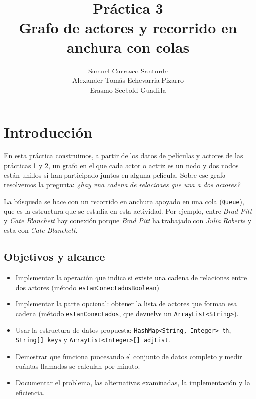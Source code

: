\documentclass[a4paper,11pt]{report}
\title{Práctica 3\\Grafo de actores y recorrido en anchura con colas}
\author{Samuel Carrasco Santurde\\Alexander Tomás Echevarria Pizarro\\Erasmo Seebold Guadilla}
\date{}
\begin{document}
\maketitle
\tableofcontents
\listoftables

\setlength{\parskip}{0.9em plus 0.2em minus 0.1em}

\chapter{Introducción}

En esta práctica construimos, a partir de los datos de películas y actores de las prácticas 1 y 2, un grafo en el que cada actor o actriz es un nodo y dos nodos están unidos si han participado juntos en alguna película. Sobre ese grafo resolvemos la pregunta: \emph{¿hay una cadena de relaciones que una a dos actores?}

La búsqueda se hace con un recorrido en anchura apoyado en una cola (\texttt{Queue}), que es la estructura que se estudia en esta actividad. Por ejemplo, entre \textit{Brad Pitt} y \textit{Cate Blanchett} hay conexión porque \textit{Brad Pitt} ha trabajado con \textit{Julia Roberts} y esta con \textit{Cate Blanchett}.

\section{Objetivos y alcance}

\begin{itemize}
    \item Implementar la operación que indica si existe una cadena de relaciones entre dos actores (método \texttt{estanConectadosBoolean}).
    \item Implementar la parte opcional: obtener la lista de actores que forman esa cadena (método \texttt{estanConectados}, que devuelve un \texttt{ArrayList<String>}).
    \item Usar la estructura de datos propuesta: \texttt{HashMap<String, Integer> th}, \texttt{String[] keys} y \texttt{ArrayList<Integer>[] adjList}.
    \item Demostrar que funciona procesando el conjunto de datos completo y medir cuántas llamadas se calculan por minuto.
    \item Documentar el problema, las alternativas examinadas, la implementación y la eficiencia.
\end{itemize}
\end{document}
